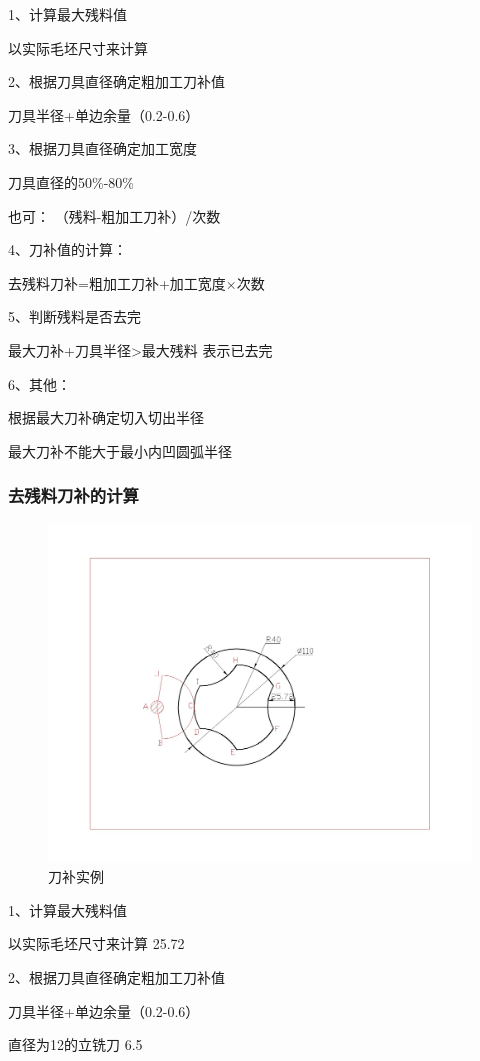 1、计算最大残料值

以实际毛坯尺寸来计算

2、根据刀具直径确定粗加工刀补值

刀具半径+单边余量（0.2-0.6）

3、根据刀具直径确定加工宽度

刀具直径的50\%-80\%

也可： （残料-粗加工刀补）/次数

4、刀补值的计算：

去残料刀补=粗加工刀补+加工宽度×次数

5、判断残料是否去完

最大刀补+刀具半径>最大残料  表示已去完

6、其他：

根据最大刀补确定切入切出半径

最大刀补不能大于最小内凹圆弧半径

\subsubsection{去残料刀补的计算}

\begin{figure}[h]
	\centering
	\includegraphics[width=0.8\linewidth,trim=280 250 430 280,clip]{data/image/8-2.jpg}
	\caption{刀补实例}
	\label{fig:9-1}
\end{figure}

1、计算最大残料值

以实际毛坯尺寸来计算  25.72

2、根据刀具直径确定粗加工刀补值

刀具半径+单边余量（0.2-0.6）

直径为12的立铣刀   6.5

